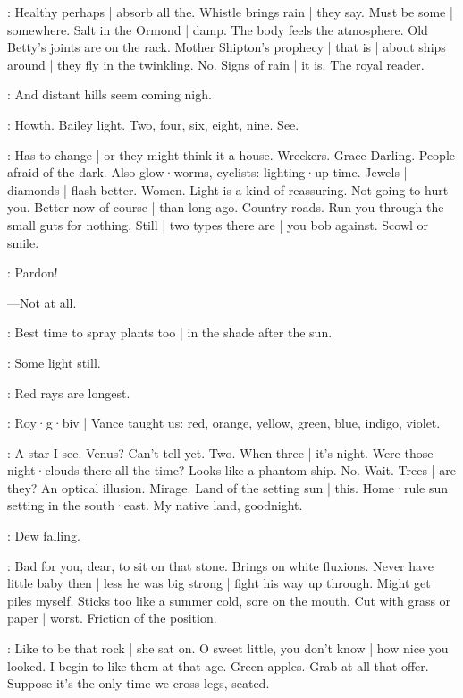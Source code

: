 \BloomAbstract:
Healthy perhaps |
absorb all the.
Whistle brings rain |
they say.
Must be some |
somewhere.
Salt in the Ormond |
damp.
The body feels the atmosphere.
Old Betty's joints are on the rack.
Mother Shipton's prophecy |
that is |
about ships around |
they fly in the twinkling.
No.
Signs of rain |
it is.
The royal reader.

\BloomCurrent:
And distant hills seem coming nigh.

\BloomCurrent:
Howth.
Bailey light.
Two,
four,
six,
eight,
nine.
See.

\BloomAbstract:
Has to change |
or they might think it a house.
Wreckers.
Grace Darling.
People afraid of the dark.
Also glow·worms,
cyclists:
lighting·up time.%
Jewels |
diamonds |
flash better.
Women.
Light is a kind of reassuring.
Not going to hurt you.
Better now of course |
than long ago.
Country roads.
Run you through the small guts for nothing.
Still |
two types there are |
you bob against.
Scowl or smile.

\BloomOther:
Pardon!

---Not at all.

\BloomAbstract:
Best time to spray plants too |
in the shade after the sun.

\BloomCurrent:
Some light still.

\BloomAbstract:
Red rays are longest.

\BloomHist:
Roy·g·biv |
Vance taught us:
red,
orange,
yellow,
green,
blue,
indigo,
violet.

\BloomCurrent:
A star
I see.
Venus?
Can't tell yet.
Two.
When three |
it's night.
Were those night·clouds there all the time?
Looks like a phantom ship.
No.
Wait.
Trees |
are they?
An optical illusion.
Mirage.
Land of the setting sun |
this.
Home·rule sun setting in the south·east.
My native land,%
goodnight.

\BloomCurrent:
Dew falling.

\BloomAbstract:
Bad for you,
dear,
to sit on that stone.
Brings on white fluxions.
Never have little baby then |
less he was big strong |
fight his way up through.
Might get piles myself.
Sticks too like a summer cold,
sore on the mouth.
Cut with grass or paper |
worst.
Friction of the position.

\BloomCurrent:
Like to be that rock |
she sat on.
O sweet little,
you don't know |
how nice you looked.
I begin to like them at that age.
Green apples.
Grab at all that offer.
Suppose it's the only time we cross legs,
seated.


